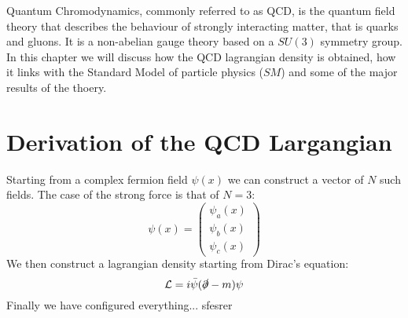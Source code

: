 Quantum Chromodynamics, commonly referred to as QCD, is the quantum field theory that describes the behaviour of strongly interacting matter, that is quarks and gluons. It is a non-abelian gauge theory based on a $SU(3)$ symmetry group. In this chapter we will discuss how the QCD lagrangian density is obtained, how it links with the Standard Model of particle physics ($SM$) and some of the major results of the thoery. \cite{peskin}

\section{Derivation of the QCD Largangian}
Starting from a complex fermion field $\psi(x)$ we can construct a vector of $N$ such fields. The case of the strong force is that of $N=3$:
\begin{equation}
  \psi(x) = \begin{pmatrix}
      \psi_a(x)\\
      \psi_b(x)\\
      \psi_c(x)
  \end{pmatrix}
\end{equation}
We then construct a lagrangian density starting from Dirac's equation:
\begin{equation}
  \mathcal{L} = i\bar{\psi}(\slashed{\partial} - m )\psi
\end{equation}
Finally we have configured everything...
sfesrer
